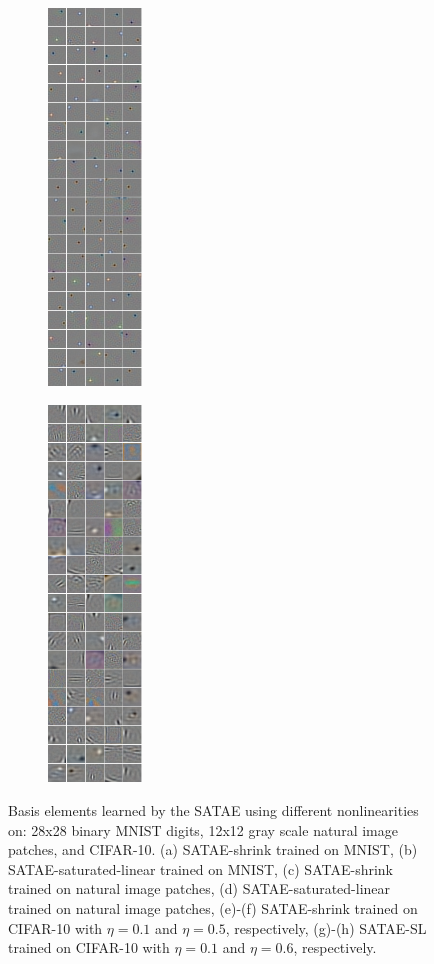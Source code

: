\documentclass{article} %
\begin{document}
\begin{figure}
\begin{subfigure}[b]{0.2\textwidth}
		\includegraphics[width=2.5cm, height=10cm]{./Figures/CIFAR_sat_linear300_1.png}
		\caption{}
	\end{subfigure} 
	\begin{subfigure}[b]{0.2\textwidth}
		\centering 
		\includegraphics[width=2.5cm, height=10cm]{./Figures/CIFAR_sat_linear300_6.png}
		\caption{}
	\end{subfigure} 
\caption{Basis elements learned by the SATAE using different nonlinearities on: 28x28 binary MNIST digits, 12x12 gray scale natural image patches, and CIFAR-10. (a) SATAE-shrink trained on MNIST, (b) SATAE-saturated-linear trained on MNIST, (c) SATAE-shrink trained on natural image patches, (d) SATAE-saturated-linear trained on natural image patches, (e)-(f) SATAE-shrink trained on CIFAR-10 with $\eta=0.1$ and $\eta=0.5$, respectively, (g)-(h) SATAE-SL trained on CIFAR-10 with $\eta=0.1$ and $\eta=0.6$, respectively.  }
\label{fig:results}
\end{figure} 
\end{document}
